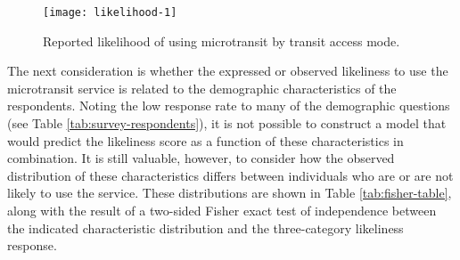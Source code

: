 \documentclass[smartcities,article,submit,moreauthors,pdftex]{Definitions/mdpi}
\begin{document}
\begin{figure}
\texttt{[image: likelihood-1]} \caption{Reported likelihood of using microtransit by transit access mode.}\label{fig:likelihood}
\end{figure}

The next consideration is whether the expressed or observed likeliness to use the microtransit service is related to the demographic characteristics of the respondents. Noting the low response rate to many of the demographic questions (see Table \ref{tab:survey-respondents}), it is not possible to construct a model that would predict the likeliness score as a function of these characteristics in combination. It is still valuable, however, to consider how the observed distribution of these characteristics differs between individuals who are or are not likely to use the service. These distributions are shown in Table \ref{tab:fisher-table}, along with the result of a two-sided Fisher exact test of independence between the indicated characteristic distribution and the three-category likeliness response.
\end{document}
